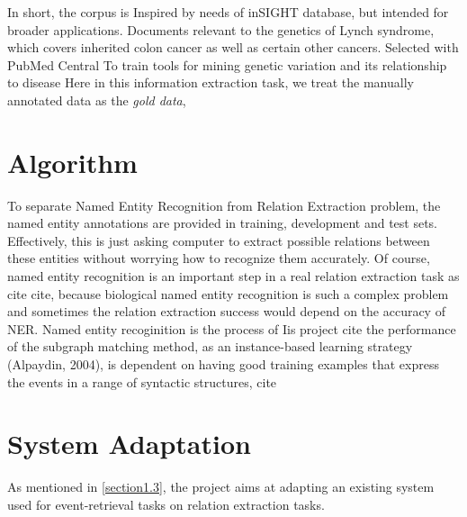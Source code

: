 In short, the corpus is Inspired by needs of inSIGHT database, but intended for broader applications. Documents relevant to the genetics of Lynch syndrome, which covers inherited colon cancer as well as certain other cancers. Selected with PubMed Central To train tools for mining genetic variation and its relationship to disease
Here in this information extraction task, we treat the manually annotated data as the \emph{gold data}, 
\section{Algorithm}
To separate Named Entity Recognition from Relation Extraction problem, the named entity annotations are provided in training, development and test sets. Effectively, this is just asking computer to extract possible relations between these entities without worrying how to recognize them accurately. Of course, named entity recognition is an important step in a real relation extraction task as cite cite, because biological named entity recognition is such a complex problem and sometimes the relation extraction success would depend on the accuracy of NER.
Named entity recoginition is the process of 
Iis project 
cite
the performance of the subgraph matching method, as an instance-based learning strategy (Alpaydin, 2004), is dependent on having good training examples that express the events in a range of syntactic structures, cite

\section{System Adaptation}
As mentioned in \ref{section1.3}, the project aims at adapting an existing system used for event-retrieval tasks on relation extraction tasks.
